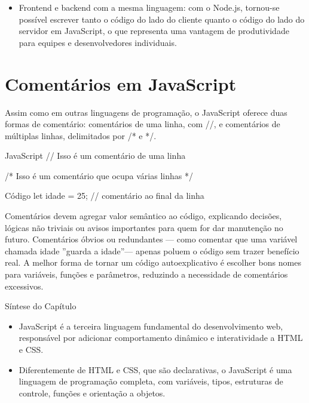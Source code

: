 \begin{itemize}
  \item Frontend e backend com a mesma linguagem: com o Node.js, tornou-se possível escrever tanto o código do lado do cliente quanto o código do lado do servidor em JavaScript, o que representa uma vantagem de produtividade para equipes e desenvolvedores individuais.
\end{itemize}

\section{Comentários em JavaScript}

Assim como em outras linguagens de programação, o JavaScript oferece duas formas de comentário: comentários de uma linha, com //, e comentários de múltiplas linhas, delimitados por /* e */.

\begin{codebox}{JavaScript}
 // Isso é um comentário de uma linha
\end{codebox}

\begin{infobox}{/*}
Isso é um comentário que ocupa várias linhas */
\end{infobox}

\begin{codebox}{Código}
let idade = 25; // comentário ao final da linha
\end{codebox}

Comentários devem agregar valor semântico ao código, explicando decisões, lógicas não triviais ou avisos importantes para quem for dar manutenção no futuro. Comentários óbvios ou redundantes — como comentar que uma variável chamada idade ”guarda a idade”— apenas poluem o código sem trazer benefício real. A melhor forma de tornar um código autoexplicativo é escolher bons nomes para variáveis, funções e parâmetros, reduzindo a necessidade de comentários excessivos.

Síntese do Capítulo

\begin{itemize}
  \item JavaScript é a terceira linguagem fundamental do desenvolvimento web, responsável por adicionar comportamento dinâmico e interatividade a HTML e CSS.
\end{itemize}

\begin{itemize}
  \item Diferentemente de HTML e CSS, que são declarativas, o JavaScript é uma linguagem de programação completa, com variáveis, tipos, estruturas de controle, funções e orientação a objetos.
\end{itemize}


